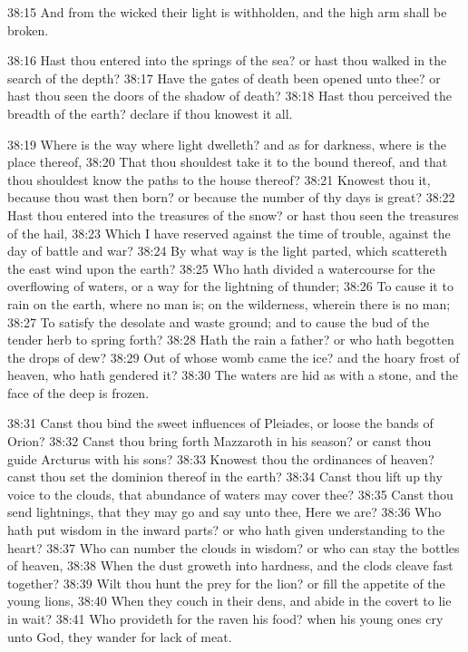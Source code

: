 38:15 And from the wicked their light is withholden, and the high arm shall be broken.

38:16 Hast thou entered into the springs of the sea? or hast thou walked in the search of the depth?  38:17 Have the gates of death been opened unto thee? or hast thou seen the doors of the shadow of death?  38:18 Hast thou perceived the breadth of the earth? declare if thou knowest it all.

38:19 Where is the way where light dwelleth? and as for darkness, where is the place thereof, 38:20 That thou shouldest take it to the bound thereof, and that thou shouldest know the paths to the house thereof?  38:21 Knowest thou it, because thou wast then born? or because the number of thy days is great?  38:22 Hast thou entered into the treasures of the snow? or hast thou seen the treasures of the hail, 38:23 Which I have reserved against the time of trouble, against the day of battle and war?  38:24 By what way is the light parted, which scattereth the east wind upon the earth?  38:25 Who hath divided a watercourse for the overflowing of waters, or a way for the lightning of thunder; 38:26 To cause it to rain on the earth, where no man is; on the wilderness, wherein there is no man; 38:27 To satisfy the desolate and waste ground; and to cause the bud of the tender herb to spring forth?  38:28 Hath the rain a father? or who hath begotten the drops of dew?  38:29 Out of whose womb came the ice? and the hoary frost of heaven, who hath gendered it?  38:30 The waters are hid as with a stone, and the face of the deep is frozen.

38:31 Canst thou bind the sweet influences of Pleiades, or loose the bands of Orion?  38:32 Canst thou bring forth Mazzaroth in his season?  or canst thou guide Arcturus with his sons?  38:33 Knowest thou the ordinances of heaven? canst thou set the dominion thereof in the earth?  38:34 Canst thou lift up thy voice to the clouds, that abundance of waters may cover thee?  38:35 Canst thou send lightnings, that they may go and say unto thee, Here we are?  38:36 Who hath put wisdom in the inward parts? or who hath given understanding to the heart?  38:37 Who can number the clouds in wisdom? or who can stay the bottles of heaven, 38:38 When the dust groweth into hardness, and the clods cleave fast together?  38:39 Wilt thou hunt the prey for the lion? or fill the appetite of the young lions, 38:40 When they couch in their dens, and abide in the covert to lie in wait?  38:41 Who provideth for the raven his food? when his young ones cry unto God, they wander for lack of meat.

